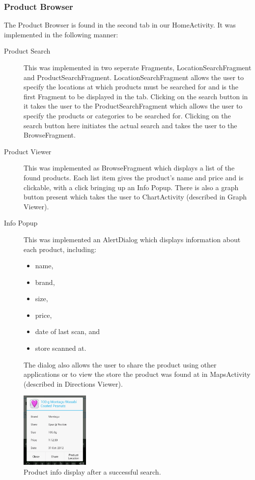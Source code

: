 \subsubsection{Product Browser}
The Product Browser is found in the second tab in our HomeActivity. It was
implemented in the following manner:
\begin{description}
\item[Product Search] This was implemented in two seperate Fragments,
LocationSearchFragment and ProductSearchFragment. LocationSearchFragment allows
the user to specify the locations at which products must be searched for and is
the first Fragment to be displayed in the tab. Clicking on the search button in
it takes the user to the ProductSearchFragment which allows the user to specify
the products or categories to be searched for. Clicking on the search button
here initiates the actual search and takes the user to the BrowseFragment.
\item[Product Viewer] This was implemented as BrowseFragment which displays a
list of the found products. Each list item gives the product's name and price
and is clickable, with a click bringing up an Info Popup. There is also a graph
button present which takes the user to ChartActivity (described in Graph
Viewer).
\item[Info Popup] This was implemented an AlertDialog which displays
information about each product, including:
\begin{itemize}
  \item name,
  \item brand,
  \item size,
  \item price,
  \item date of last scan, and
  \item store scanned at.
\end{itemize} 
The dialog also allows the user to share the product using other applications or
to view the store the product was found at in MapsActivity (described in
Directions Viewer).
\end{description}
\begin{figure}[h!]
\centering
\includegraphics[width=0.3\textwidth]{product-info.png}
\caption{Product info display after a successful search.}
\end{figure}